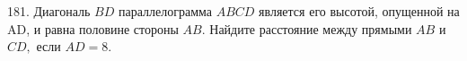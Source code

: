 181. Диагональ $BD$ параллелограмма $ABCD$ является его высотой, опущенной на AD, и равна половине стороны $AB.$ Найдите расстояние между прямыми $AB$ и $CD,$ если $AD = 8.$\\
